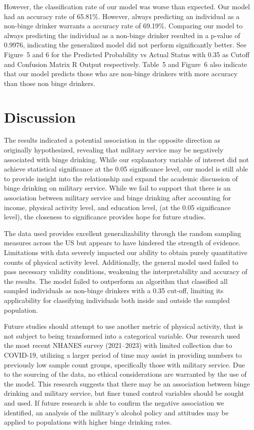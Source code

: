 \documentclass[12pt]{article}
\begin{document}
However, the classification rate of our model was worse than expected. Our model had an accuracy rate of 65.81\%. However, always predicting an individual as a non-binge drinker warrants a accuracy rate of 69.19\%. Comparing our model to always predicting the individual as a non-binge drinker resulted in a p-value of 0.9976, indicating the generalized model did not perform significantly better. See Figure~5 and 6 for the Predicted Probability vs Actual Status with 0.35 as Cutoff and Confusion Matrix R Output respectively. Table~5 and Figure~6 also indicate that our model predicts those who are non-binge drinkers with more accuracy than those non binge drinkers.

\section{Discussion}

The results indicated a potential association in the opposite direction as originally hypothesized, revealing that military service may be negatively associated with binge drinking. While our explanatory variable of interest did not achieve statistical significance at the 0.05 significance level, our model is still able to provide insight into the relationship and expand the academic discussion of binge drinking on military service. While we fail to support that there is an association between military service and binge drinking after accounting for income, physical activity level, and education level, (at the 0.05 significance level), the closeness to significance provides hope for future studies.

The data used provides excellent generalizability through the random sampling measures across the US but appears to have hindered the strength of evidence. Limitations with data severely impacted our ability to obtain purely quantitative counts of physical activity level. Additionally, the general model used failed to pass necessary validity conditions, weakening the interpretability and accuracy of the results. The model failed to outperform an algorithm that classified all sampled individuals as non-binge drinkers with a 0.35 cut-off, limiting its applicability for classifying individuals both inside and outside the sampled population.

Future studies should attempt to use another metric of physical activity, that is not subject to being transformed into a categorical variable. Our research used the most recent NHANES survey (2021--2023) with limited collection due to COVID-19, utilizing a larger period of time may assist in providing numbers to previously low sample count groups, specifically those with military service. Due to the sourcing of the data, no ethical considerations are warranted by the use of the model. This research suggests that there may be an association between binge drinking and military service, but finer tuned control variables should be sought and used. If future research is able to confirm the negative association we identified, an analysis of the military's alcohol policy and attitudes may be applied to populations with higher binge drinking rates.
\end{document}
